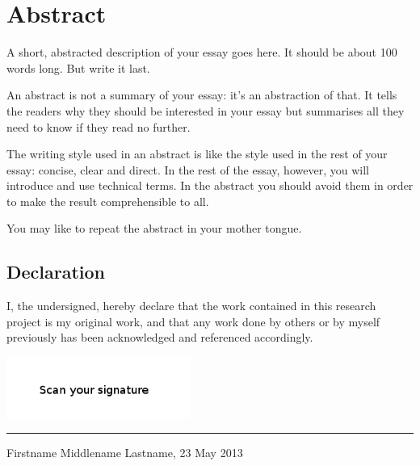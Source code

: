 \chapter*{Abstract} 

A short, abstracted description of your essay goes here. 
It should be about 100 words long. But write it last.

An abstract is not a summary of your essay: it's an abstraction of that. 
It tells the readers why they should be interested in your essay but summarises all
they need to know if they read no further.

The writing style used in an abstract is like the style used in the rest of your essay: concise, clear and direct. 
In the rest of the essay, however, you will introduce and use technical terms. In the abstract you should
avoid them in order to make the result comprehensible to all.

You may like to repeat the abstract in your mother tongue.



\vfill
\section*{Declaration}
I, the undersigned, hereby declare that the work contained in this research project is my original work, and that any work done by others or by myself previously has been acknowledged and referenced accordingly.

\includegraphics[height=2cm]{images/signature.png} \newline \hrule
Firstname Middlename Lastname, 23 May 2013

